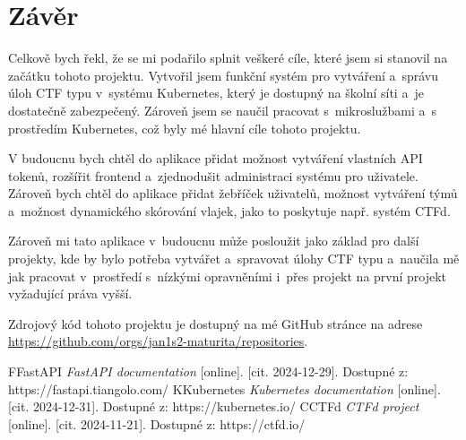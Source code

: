 \documentclass[12pt, a4paper,
oneside,      %
openright
]{report}
\begin{document}
	\chapter{Závěr}

	Celkově bych řekl, že se mi podařilo splnit veškeré cíle, které jsem si stanovil na začátku tohoto projektu. Vytvořil jsem funkční systém pro vytváření a~správu úloh CTF typu v~systému Kubernetes, který je dostupný na školní síti a~je dostatečně zabezpečený. Zároveň jsem se naučil pracovat s~mikroslužbami a~s prostředím Kubernetes, což byly mé hlavní cíle tohoto projektu.

	V budoucnu bych chtěl do aplikace přidat možnost vytváření vlastních API tokenů, rozšířit frontend a~zjednodušit administraci systému pro uživatele. Zároveň bych chtěl do aplikace přidat žebříček uživatelů, možnost vytváření týmů a~možnost dynamického skórování vlajek, jako to poskytuje např. systém CTFd.

	Zároveň mi tato aplikace v~budoucnu může posloužit jako základ pro další projekty, kde by bylo potřeba vytvářet a~spravovat úlohy CTF typu a~naučila mě jak pracovat v~prostředí s~nízkými opravněními i~přes projekt na první projekt vyžadující práva vyšší.

	Zdrojový kód tohoto projektu je dostupný na mé GitHub stránce na adrese \url{https://github.com/orgs/jan1s2-maturita/repositories}.
	
	\renewcommand{\bibname}{Seznam použitých zdrojů}
	\begin{thebibliography}{99}
		\bibitem FFastAPI \textit{FastAPI documentation} [online]. [cit. 2024-12-29]. Dostupné z: https://fastapi.tiangolo.com/
		\bibitem KKubernetes \textit{Kubernetes documentation} [online]. [cit. 2024-12-31]. Dostupné z: https://kubernetes.io/
		\bibitem CCTFd \textit{CTFd project} [online]. [cit. 2024-11-21]. Dostupné z: https://ctfd.io/
	\end{thebibliography}
	
	
	
	\appendix %
	
	[\vspace{-22pt}] %
	
	
	
	
\end{document}
